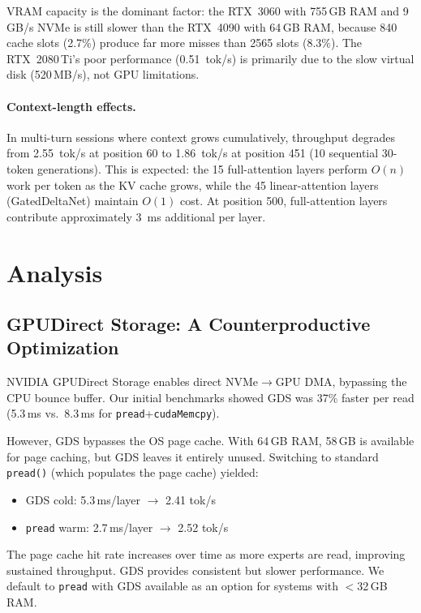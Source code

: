 \documentclass[11pt]{article}
\begin{document}
VRAM capacity is the dominant factor: the RTX~3060 with 755\,GB RAM and 9\,GB/s NVMe is still slower than the RTX~4090 with 64\,GB RAM, because 840 cache slots (2.7\%) produce far more misses than 2565 slots (8.3\%). The RTX~2080\,Ti's poor performance (0.51~tok/s) is primarily due to the slow virtual disk (520\,MB/s), not GPU limitations.

\paragraph{Context-length effects.} In multi-turn sessions where context grows cumulatively, throughput degrades from 2.55~tok/s at position 60 to 1.86~tok/s at position 451 (10 sequential 30-token generations). This is expected: the 15 full-attention layers perform $O(n)$ work per token as the KV cache grows, while the 45 linear-attention layers (GatedDeltaNet) maintain $O(1)$ cost. At position 500, full-attention layers contribute approximately 3~ms additional per layer.

\section{Analysis}

\subsection{GPUDirect Storage: A Counterproductive Optimization}
\label{sec:gds}

NVIDIA GPUDirect Storage enables direct NVMe$\to$GPU DMA, bypassing the CPU bounce buffer. Our initial benchmarks showed GDS was 37\% faster per read (5.3\,ms vs.\ 8.3\,ms for \texttt{pread}+\texttt{cudaMemcpy}).

However, GDS bypasses the OS page cache. With 64\,GB RAM, 58\,GB is available for page caching, but GDS leaves it entirely unused. Switching to standard \texttt{pread()} (which populates the page cache) yielded:

\begin{itemize}[nosep]
    \item GDS cold: 5.3\,ms/layer $\to$ 2.41 tok/s
    \item \texttt{pread} warm: 2.7\,ms/layer $\to$ 2.52 tok/s
\end{itemize}

The page cache hit rate increases over time as more experts are read, improving sustained throughput. GDS provides consistent but slower performance. We default to \texttt{pread} with GDS available as an option for systems with $<$32\,GB RAM.
\end{document}
